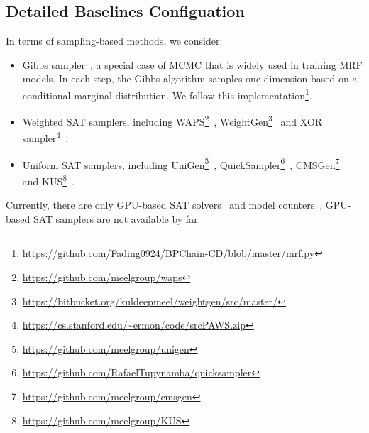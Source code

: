 
\subsection{Detailed Baselines Configuation} 
In terms of sampling-based methods, we consider:
\begin{itemize}
\item Gibbs sampler~\cite{carter1994gibbs}, a special case of MCMC that is  widely used in training MRF models. In each step, the Gibbs algorithm samples 
one dimension based on a conditional marginal distribution. We follow this implementation\footnote{\url{https://github.com/Fading0924/BPChain-CD/blob/master/mrf.py}}.
    \item Weighted SAT samplers, including WAPS\footnote{\url{https://github.com/meelgroup/waps}}~\cite{DBLP:conf/tacas/GuptaSRM19}, WeightGen\footnote{\url{https://bitbucket.org/kuldeepmeel/weightgen/src/master/}}~\cite{DBLP:conf/aaai/ChakrabortyFMSV14} and XOR sampler\footnote{\url{https://cs.stanford.edu/~ermon/code/srcPAWS.zip}}~\cite{DBLP:conf/nips/ErmonGSS13,DBLP:conf/uai/DingX21}.
    \item Uniform SAT samplers, including UniGen\footnote{\url{https://github.com/meelgroup/unigen}}~\cite{DBLP:conf/cav/SoosGM20}, QuickSampler\footnote{\url{https://github.com/RafaelTupynamba/quicksampler}}~\cite{DBLP:conf/icse/DutraLBS18}, CMSGen\footnote{\url{https://github.com/meelgroup/cmsgen}}~\cite{DBLP:conf/fmcad/GoliaSCM21} and KUS\footnote{\url{https://github.com/meelgroup/KUS}}~\cite{DBLP:conf/lpar/SharmaGRM18}.
\end{itemize}
Currently, there are only GPU-based SAT solvers~\cite{DBLP:conf/sat/PrevotSM21,mahmoud2022gpu} and model counters~\cite{DBLP:conf/cp/FichteHZ19}, GPU-based SAT samplers are not available by far.

